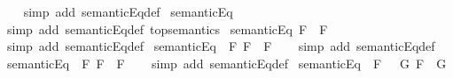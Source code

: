 \begin{isabellebody}
%
\isadelimproof
\ \ %
\endisadelimproof
%
\isatagproof
{}\isamarkupfalse%
\ {\isacharparenleft}simp\ add{\isacharcolon}\ semanticEq{\isacharunderscore}def{\isacharparenright}%
\endisatagproof
{\isafoldproof}%
%
\isadelimproof
\isanewline
%
\endisadelimproof
\isanewline
{}\isamarkupfalse%
\ {\isachardoublequoteopen}semanticEq\ {\isasymbottom}\ {\isacharparenleft}\isactrlbold {\isasymnot}\ {\isasymtop}{\isacharparenright}{\isachardoublequoteclose}\isanewline
%
\isadelimproof
\ \ %
\endisadelimproof
%
\isatagproof
{}\isamarkupfalse%
\ {\isacharparenleft}simp\ add{\isacharcolon}\ semanticEq{\isacharunderscore}def\ top{\isacharunderscore}semantics{\isacharparenright}%
\endisatagproof
{\isafoldproof}%
%
\isadelimproof
\isanewline
%
\endisadelimproof
\isanewline
{}\isamarkupfalse%
\ {\isachardoublequoteopen}semanticEq\ F\ {\isacharparenleft}\isactrlbold {\isasymnot}{\isacharparenleft}\isactrlbold {\isasymnot}\ F{\isacharparenright}{\isacharparenright}{\isachardoublequoteclose}\isanewline
%
\isadelimproof
\ \ %
\endisadelimproof
%
\isatagproof
{}\isamarkupfalse%
\ {\isacharparenleft}simp\ add{\isacharcolon}\ semanticEq{\isacharunderscore}def{\isacharparenright}%
\endisatagproof
{\isafoldproof}%
%
\isadelimproof
\isanewline
%
\endisadelimproof
\isanewline
{}\isamarkupfalse%
\ {\isachardoublequoteopen}semanticEq\ {\isacharparenleft}\isactrlbold {\isasymnot}{\isacharparenleft}\isactrlbold {\isasymnot}\ F{\isacharparenright}{\isacharparenright}\ {\isacharparenleft}F\ \isactrlbold {\isasymor}\ F{\isacharparenright}{\isachardoublequoteclose}\isanewline
%
\isadelimproof
\ \ %
\endisadelimproof
%
\isatagproof
{}\isamarkupfalse%
\ {\isacharparenleft}simp\ add{\isacharcolon}\ semanticEq{\isacharunderscore}def{\isacharparenright}%
\endisatagproof
{\isafoldproof}%
%
\isadelimproof
\isanewline
%
\endisadelimproof
\isanewline
{}\isamarkupfalse%
\ {\isachardoublequoteopen}semanticEq\ {\isacharparenleft}\isactrlbold {\isasymnot}{\isacharparenleft}\isactrlbold {\isasymnot}\ F{\isacharparenright}{\isacharparenright}\ {\isacharparenleft}F\ \isactrlbold {\isasymand}\ F{\isacharparenright}{\isachardoublequoteclose}\isanewline
%
\isadelimproof
\ \ %
\endisadelimproof
%
\isatagproof
{}\isamarkupfalse%
\ {\isacharparenleft}simp\ add{\isacharcolon}\ semanticEq{\isacharunderscore}def{\isacharparenright}%
\endisatagproof
{\isafoldproof}%
%
\isadelimproof
\isanewline
%
\endisadelimproof
\isanewline
{}\isamarkupfalse%
\ {\isachardoublequoteopen}semanticEq\ {\isacharparenleft}\isactrlbold {\isasymnot}\ F\ \isactrlbold {\isasymand}\ \isactrlbold {\isasymnot}\ G{\isacharparenright}\ {\isacharparenleft}\isactrlbold {\isasymnot}{\isacharparenleft}F\ \isactrlbold {\isasymor}\ G{\isacharparenright}{\isacharparenright}{\isachardoublequoteclose}\isanewline

\end{isabellebody}
